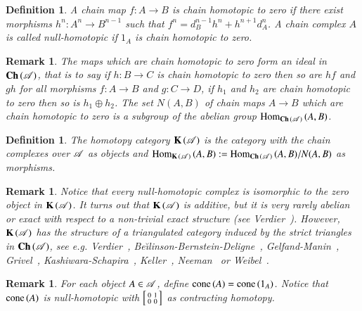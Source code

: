 \documentclass[1p]{elsarticle}
\theoremstyle{mythm}
\theoremstyle{mydef}
\newtheorem{Rem}[Thm]{Remark}
\newtheorem{Def}[Thm]{Definition}
\begin{document}
\begin{Def}
  \label{def:chain-homotopy}
  A chain map $f:A \to B$ is \emph{chain homotopic to zero} if there exist
  morphisms $h^{n}:A^{n} \to B^{n-1}$ such that 
  $f^{n} = d_{B}^{n-1}h^{n} + h^{n+1}d_{A}^{n}$. A chain complex $A$ is
  called \emph{null-homotopic} if $1_{A}$ is chain homotopic to zero.
\end{Def}

\begin{Rem}
The maps which are chain homotopic to zero form an ideal in
$\operatorname{\mathbf{Ch}}{(\operatorname{\mathscr{A}})}$, that is to say if $h: B \to C$ is chain homotopic to zero then
so are $hf$ and $gh$ for all morphisms $f: A \to B$ and $g: C \to D$,
if $h_{1}$ and $h_{2}$ are chain homotopic to zero then so is 
$h_{1} \oplus h_{2}$. The set $N{(A,B)}$ 
of chain maps $A \to B$ which are chain homotopic to zero is a
subgroup of the abelian group $\operatorname{Hom}_{\operatorname{\mathbf{Ch}}{(\operatorname{\mathscr{A}})}}{(A,B)}$. 
\end{Rem}

\begin{Def}
  The \emph{homotopy category} $\operatorname{\mathbf{K}}{(\operatorname{\mathscr{A}})}$ is the category with the
  chain complexes over $\operatorname{\mathscr{A}}$ as  objects and 
  $\operatorname{Hom}_{\operatorname{\mathbf{K}}{(\operatorname{\mathscr{A}})}}{(A,B)} := \operatorname{Hom}_{\operatorname{\mathbf{Ch}}{(\operatorname{\mathscr{A}})}}{(A,B)} /
  N{(A,B)}$ as morphisms.
\end{Def}

\begin{Rem}
  \label{rem:htpy-cat-triangulated}
  Notice that every null-homotopic complex is isomorphic 
  to the zero object in $\operatorname{\mathbf{K}}{(\operatorname{\mathscr{A}})}$.
  It turns out that $\operatorname{\mathbf{K}}{(\operatorname{\mathscr{A}})}$ is additive, but it is very rarely
  abelian or exact with respect to a
  non-trivial exact structure (see Verdier~\cite[Ch.II,
  1.3.6]{MR1453167}). However, $\operatorname{\mathbf{K}}{(\operatorname{\mathscr{A}})}$
  has the structure of a \emph{triangulated category} induced by the
  \emph{strict triangles} in $\operatorname{\mathbf{Ch}}{(\operatorname{\mathscr{A}})}$, see
  e.g. Verdier~\cite{MR1453167},
  Be\u\i{}linson-Bernstein-Deligne~\cite{MR751966}, 
  Gelfand-Manin~\cite{MR1950475}, 
  Grivel~\cite[Chapter~I]{MR882000},
  Kashiwara-Schapira~\cite{MR2182076}, 
  Keller~\cite{MR1421815},
  Neeman~\cite{MR1812507} or Weibel~\cite{MR1269324}.
\end{Rem}

\begin{Rem}
  For each object $A \in \operatorname{\mathscr{A}}$, define $\operatorname{cone}{(A)} =
  \operatorname{cone}{(1_{A})}$. Notice that $\operatorname{cone}{(A)}$ is null-homotopic with
  $\left[\begin{smallmatrix} 0 & 1 \\ 0 & 0 \end{smallmatrix}\right]$ as contracting homotopy.
\end{Rem}
\end{document}
